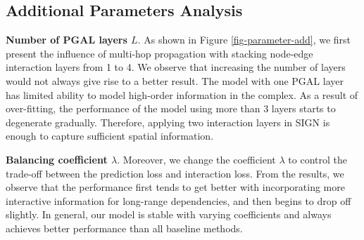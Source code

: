 \documentclass[sigconf]{acmart}
\newcommand{\B}[1]{{\bfseries #1}}
\newcommand{\model}{\textsf{SIGN}\xspace}
\newcommand{\gnn}{PGAL\xspace}
\begin{document}
\subsection{Additional Parameters Analysis}
\label{a-para}



\B{Number of \gnn layers $L$}. As shown in Figure \ref{fig-parameter-add}, we first present the influence of multi-hop propagation with stacking node-edge interaction layers from 1 to 4. We observe that increasing the number of layers would not always give rise to a better result. The model with one \gnn layer has limited ability to model high-order information in the complex. As a result of over-fitting, the performance of the model using more than 3 layers starts to degenerate gradually. Therefore, applying two interaction layers in \model is enough to capture sufficient spatial information.

\B{Balancing coefficient $\lambda$}. Moreover, we change the coefficient $\lambda$ to control the trade-off between the prediction loss and interaction loss. From the results, we observe that the performance first tends to get better with incorporating more interactive information for long-range dependencies, and then begins to drop off slightly. In general, our model is stable with varying coefficients and always achieves better performance than all baseline methods. 
\end{document}
